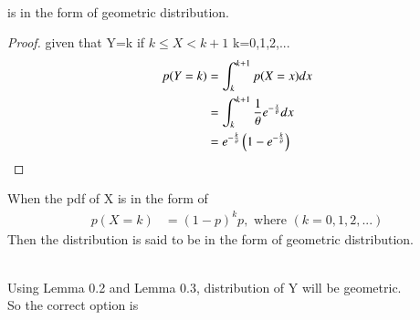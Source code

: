 \documentclass[journal,12pt,twocolumn]{IEEEtran}
\begin{document}
\begin{enumerate}
\begin{lemma}
\begin{align}
\end{align}
is in the form of geometric distribution.
\end{lemma}
\begin{proof}
given that Y=k if $k \leqslant X <k+1$ k=0,1,2,...
\begin{align}
p(Y=k)&=\int_k^{k+1} p(X=x) dx\\
&=\int_k^{k+1} \frac{1}{\theta} e^{-\frac{x}{\theta}} dx \nonumber \\
&=e^{-\frac{k}{\theta}} \left(1-e^{-\frac{k}{\theta}}\right)
\end{align}
\end{proof}
\begin{lemma}
When the pdf of X is in the form of 
\begin{align}
p(X=k)&=(1-p)^{k} p, \text{ where } (k=0,1,2,...)
\end{align} 
Then the distribution is said to be in the form of geometric distribution. 
\end{lemma}\\
Using Lemma 0.2 and Lemma 0.3, distribution of Y will be geometric.\\
So the correct option is 
\end{enumerate}
\end{document}

